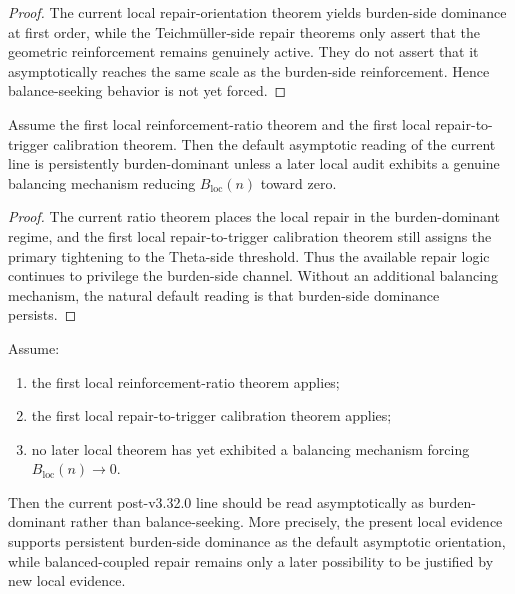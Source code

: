 \begin{proof}
The current local repair-orientation theorem yields burden-side dominance at first order, while the Teichmüller-side repair theorems only assert that the geometric reinforcement remains genuinely active. They do not assert that it asymptotically reaches the same scale as the burden-side reinforcement. Hence balance-seeking behavior is not yet forced.
\end{proof}

\begin{proposition}
\label{prop:current-line-naturally-read-as-burden-dominant-unless-later-balancing-evidence-appears}
Assume the first local reinforcement-ratio theorem and the first local repair-to-trigger calibration theorem.
Then the default asymptotic reading of the current line is persistently burden-dominant unless a later local audit exhibits a genuine balancing mechanism reducing \(B_{\mathrm{loc}}(n)\) toward zero.
\end{proposition}

\begin{proof}
The current ratio theorem places the local repair in the burden-dominant regime, and the first local repair-to-trigger calibration theorem still assigns the primary tightening to the Theta-side threshold. Thus the available repair logic continues to privilege the burden-side channel. Without an additional balancing mechanism, the natural default reading is that burden-side dominance persists.
\end{proof}

\begin{theorem}
\label{thm:first-local-asymptotic-orientation-theorem}
Assume:
\begin{enumerate}[leftmargin=2em,label=(\alph*)]
  \item the first local reinforcement-ratio theorem applies;
  \item the first local repair-to-trigger calibration theorem applies;
  \item no later local theorem has yet exhibited a balancing mechanism forcing \(B_{\mathrm{loc}}(n)\to 0\).
\end{enumerate}
Then the current post-v3.32.0 line should be read asymptotically as burden-dominant rather than balance-seeking.
More precisely, the present local evidence supports persistent burden-side dominance as the default asymptotic orientation, while balanced-coupled repair remains only a later possibility to be justified by new local evidence.
\end{theorem}

